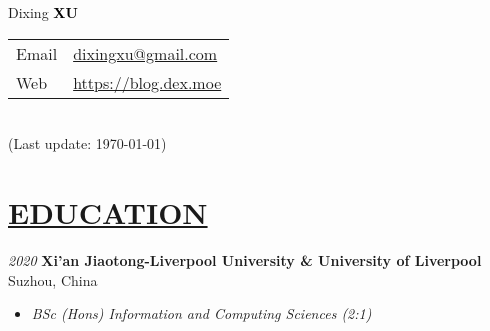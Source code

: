 \documentclass[11pt]{article}
\begin{document}
\begin{minipage}[t]{0.65\textwidth}
    {\Huge Dixing {\textbf{\textcolor{black}{XU}}}}
\end{minipage}
\begin{minipage}[t]{0.45\textwidth}
    {\small\raggedright
    \begin{tabular}{l@{: }l}
    Email & \href{mailto:dixingxu@gmail.com}{dixingxu@gmail.com} \\
    Web & \href{https://blog.dex.moe}{https://blog.dex.moe} \\
    \end{tabular}\\
    (Last update: \today)
    }
\end{minipage}



%
\section*{\centering\underline{EDUCATION}}
\noindent\textit{2020} \large\textbf{Xi'an Jiaotong-Liverpool University \& University of Liverpool} \hfill Suzhou, China
\begin{itemize}[noitemsep, nolistsep]
    \item[] \textit{BSc (Hons) Information and Computing Sciences (2:1)}
\end{itemize} 
\vspace{20mm} %
\end{document}
